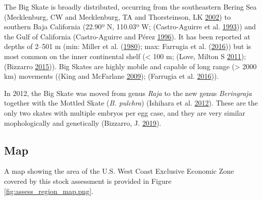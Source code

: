 \documentclass[12pt,]{article}
\begin{document}
The Big Skate is broadly distributed, occurring from the southeastern
Bering Sea (Mecklenburg, CW and Mecklenburg, TA and Thorsteinson, LK
\protect\hyperlink{ref-Mecklenburg2002}{2002}) to southern Baja
California (22.90º N, 110.03º W; (Castro-Aguirre et al.
\protect\hyperlink{ref-Castro1993}{1993})) and the Gulf of California
(Castro-Aguirre and Pérez \protect\hyperlink{ref-Castro1996}{1996}). It
has been reported at depths of 2--501 m (min: Miller et al.
(\protect\hyperlink{ref-Miller1980}{1980}); max: Farrugia et al.
(\protect\hyperlink{ref-Farrugia2016}{2016})) but is most common on the
inner continental shelf (\textless{} 100 m; (Love, Milton S
\protect\hyperlink{ref-Love2011}{2011}); (Bizzarro
\protect\hyperlink{ref-Bizzarro2015}{2015})). Big Skates are highly
mobile and capable of long range (\textgreater{} 2000 km) movements
((King and McFarlane \protect\hyperlink{ref-KingandMcF2009}{2009});
(Farrugia et al. \protect\hyperlink{ref-Farrugia2016}{2016})).

In 2012, the Big Skate was moved from genus \emph{Raja} to the new genus
\emph{Beringraja} together with the Mottled Skate (\emph{B. pulchra})
(Ishihara et al. \protect\hyperlink{ref-Ishihara2012}{2012}). These are
the only two skates with multiple embryos per egg case, and they are
very similar mophologically and genetically (Bizzarro, J.
\protect\hyperlink{ref-Bizzarro2019}{2019}).

\hypertarget{map}{%
\subsection{Map}\label{map}}

A map showing the area of the U.S. West Coast Exclusive Economic Zone
covered by this stock assessment is provided in Figure
\ref{fig:assess_region_map.png}.
\end{document}
